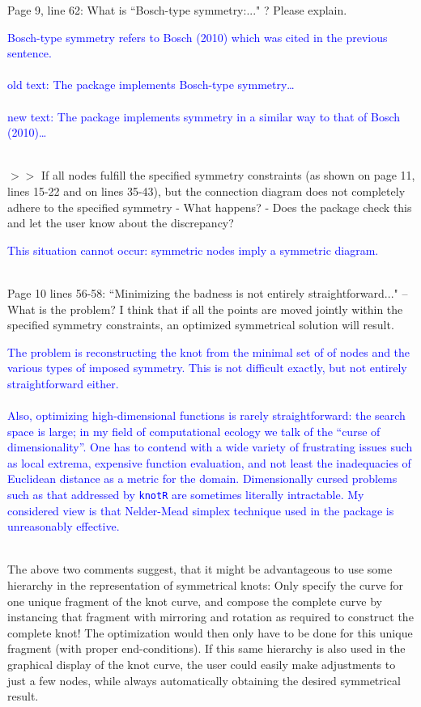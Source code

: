 \documentclass[12pt]{article}
\begin{document}
Page 9, line 62: What is ``Bosch-type symmetry:..." ?  Please explain.


\textcolor{blue}{Bosch-type symmetry refers to Bosch (2010) which was
  cited in the previous sentence.\\ \\ old text: The package
  implements Bosch-type symmetry\ldots \\ \\ new text: The package
  implements symmetry in a similar way to that of Bosch
  (2010)\ldots\\ \\}
  
$>>$ If all nodes fulfill the specified symmetry constraints (as shown
on page 11, lines 15-22 and on lines 35-43), but the connection
diagram does not completely adhere to the specified symmetry - What
happens? - Does the package check this and let the user know about the
discrepancy?

\textcolor{blue}{This situation cannot occur: symmetric nodes imply a
  symmetric diagram.\\ \\}

Page 10 lines 56-58: ``Minimizing the badness is not entirely
straightforward..."  -- What is the problem?  I think that if all the
points are moved jointly within the specified symmetry constraints, an
optimized symmetrical solution will result.

\textcolor{blue}{The problem is reconstructing the knot from the
  minimal set of of nodes and the various types of imposed symmetry.
  This is not difficult exactly, but not entirely straightforward
  either.\\ \\ Also, optimizing high-dimensional functions is rarely
  straightforward: the search space is large; in my field of
  computational ecology we talk of the ``curse of dimensionality''.
  One has to contend with a wide variety of frustrating issues such as
  local extrema, expensive function evaluation, and not least the
  inadequacies of Euclidean distance as a metric for the domain.
  Dimensionally cursed problems such as that addressed by {\tt knotR}
  are sometimes literally intractable.  My considered view is that
  Nelder-Mead simplex technique used in the package is unreasonably
  effective.\\ \\ }

{The above two comments suggest, that it might be advantageous to use
  some hierarchy in the representation of symmetrical knots: Only
  specify the curve for one unique fragment of the knot curve, and
  compose the complete curve by instancing that fragment with
  mirroring and rotation as required to construct the complete knot!
  The optimization would then only have to be done for this unique
  fragment (with proper end-conditions).  If this same hierarchy is
  also used in the graphical display of the knot curve, the user could
  easily make adjustments to just a few nodes, while always
  automatically obtaining the desired symmetrical result.}
\end{document}
